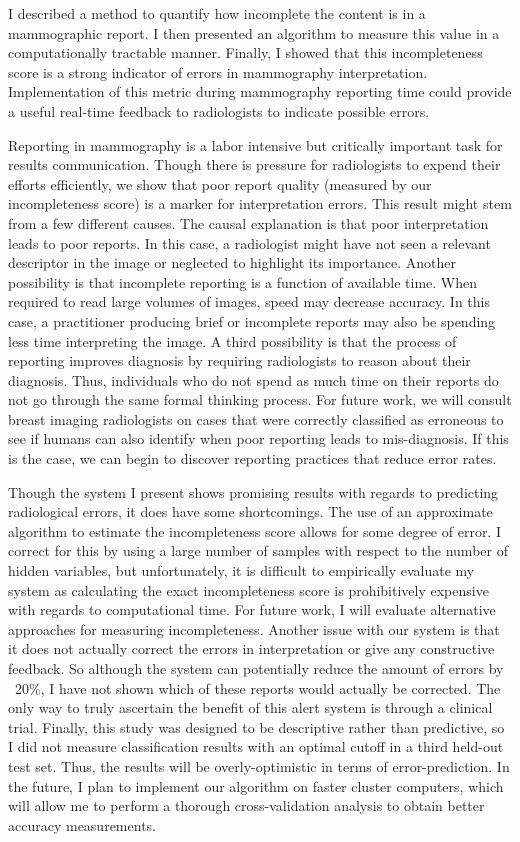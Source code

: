 I described a method to quantify how incomplete the content is in a mammographic report. I then presented an algorithm to measure this value in a computationally tractable manner. Finally, I showed that this incompleteness score is a strong indicator of errors in mammography interpretation. Implementation of this metric during mammography reporting time could provide a useful real-time feedback to radiologists to indicate possible errors.

Reporting in mammography is a labor intensive but critically important task for results communication. Though there is pressure for radiologists to expend their efforts efficiently, we show that poor report quality (measured by our incompleteness score) is a marker for interpretation errors. This result might stem from a few different causes. The causal explanation is that poor interpretation leads to poor reports. In this case, a radiologist might have not seen a relevant descriptor in the image or neglected to highlight its importance. Another possibility is that incomplete reporting is a function of available time. When required to read large volumes of images, speed may decrease accuracy. In this case, a practitioner producing brief or incomplete reports may also be spending less time interpreting the image. A third possibility is that the process of reporting improves diagnosis by requiring radiologists to reason about their diagnosis. Thus, individuals who do not spend as much time on their reports do not go through the same formal thinking process. For future work, we will consult breast imaging radiologists on cases that were correctly classified as erroneous to see if humans can also identify when poor reporting leads to mis-diagnosis. If this is the case, we can begin to discover reporting practices that reduce error rates.

Though the system I present shows promising results with regards to predicting radiological errors, it does have some shortcomings. The use of an approximate algorithm to estimate the incompleteness score allows for some degree of error. I correct for this by using a large number of samples with respect to the number of hidden variables, but unfortunately, it is difficult to empirically evaluate my system as calculating the exact incompleteness score is prohibitively expensive with regards to computational time. For future work, I will evaluate alternative approaches for measuring incompleteness. Another issue with our system is that it does not actually correct the errors in interpretation or give any constructive feedback. So although the system can potentially reduce the amount of errors by  ~20\%, I have not shown which of these reports would actually be corrected. The only way to truly ascertain the benefit of this alert system is through a clinical trial. Finally, this study was designed to be descriptive rather than predictive, so I did not measure classification results with an optimal cutoff in a third held-out test set. Thus, the results will be overly-optimistic in terms of error-prediction. In the future, I plan to implement our algorithm on faster cluster computers, which will allow me to perform a thorough cross-validation analysis to obtain better accuracy measurements. 

